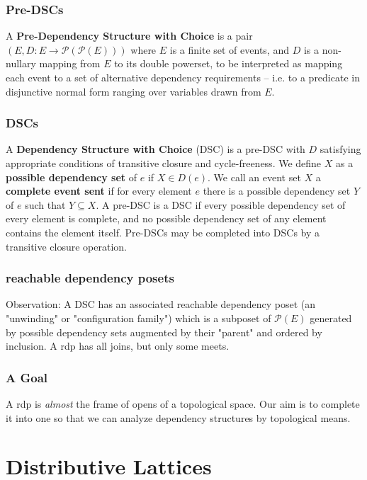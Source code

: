 \documentclass{beamer}
\newcommand{\Pc}{\mathcal{P}}
\begin{document}
\begin{frame}
\frametitle{Pre-DSCs}
\begin{definition}
A \textbf{Pre-Dependency Structure with Choice} is a pair \((E, D : E \rightarrow \Pc(\Pc(E)))\) where \(E\) is a finite set of events, and \(D\) is a non-nullary mapping from \(E\) to its double powerset, to be interpreted as mapping each event to a set of alternative dependency requirements -- i.e. to a predicate in disjunctive normal form ranging over variables drawn from \(E\).
\end{definition}
\end{frame}


\begin{frame}
\frametitle{DSCs}
\begin{definition}
A \textbf{Dependency Structure with Choice} (DSC) is a pre-DSC with \(D\) satisfying  appropriate conditions of transitive closure and cycle-freeness. We define \(X\) as a \textbf{possible dependency set} of \(e\) if \(X \in D(e)\). We call an event set \(X\) a \textbf{complete event sent} if for every element \(e\) there is a possible dependency set \(Y\) of \(e\) such that \(Y \subseteq X\). A pre-DSC is a DSC if every possible dependency set of every element is complete, and no possible dependency set of any element contains the element itself. Pre-DSCs may be completed into DSCs by a transitive closure operation.
\end{definition}
\end{frame}	

\begin{frame}
\frametitle{reachable dependency posets}
Observation: A DSC has an associated reachable dependency poset (an "unwinding" or "configuration family") which is a subposet of \(\Pc(E)\) generated by possible dependency sets augmented by their "parent" and ordered by inclusion. A rdp has all joins, but only some meets.

\end{frame}

\begin{frame}
\frametitle{A Goal}
A rdp is \textit{almost} the frame of opens of a topological space. Our aim is to complete it into one so that we can analyze dependency structures by topological means.
\end{frame}

\section{Distributive Lattices}
\end{document}
